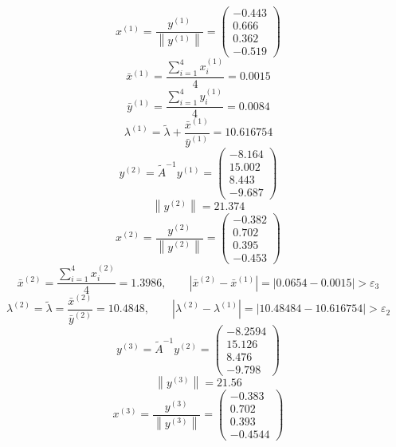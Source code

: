 \documentclass[a4paper,12pt,notitlepage,pdftex,headsepline]{scrartcl}
\begin{document}
\[
x^{\left(1\right)} = \frac{y^{\left(1\right)}}{\left\|y^{\left(1\right)}\right\|} = \left(\begin{matrix}
-0.443\\
0.666\\
0.362\\
-0.519
\end{matrix}
\right)
\]
\[
\bar{x}^{\left(1\right)} = \frac{\sum\limits_{i=1}^4{x_i^{\left(1\right)} }}{4} = 0.0015
\]
\[
\bar{y}^{\left(1\right)}  = \frac{\sum\limits_{i=1}^4{y_i^{\left(1\right)} }}{4} = 0.0084
\]
\[
\lambda^{\left(1\right)} = \tilde{\lambda} + \frac{\bar{x}^{\left(1\right)} }{\bar{y}^{\left(1\right)} } = 10.616754
\]
\[
y^{\left(2\right)} = \tilde{A}^{-1} y^{\left(1\right)}  = \left(\begin{matrix}
-8.164\\
15.002\\
8.443\\
-9.687
\end{matrix}
\right)
\]
\[\left\|y^{\left(2\right)} \right\| = 21.374\]
\[x^{\left(2\right)} = \frac{y^{\left(2\right)} }{\left\|y^{\left(2\right)} \right\|}=\left(\begin{matrix}
-0.382\\
0.702\\
0.395\\
-0.453
\end{matrix}\right)\]
\[\bar{x}^{\left(2\right)} = \frac{\sum\limits_{i=1}^4{x_i^{\left(2\right)} }}{4} = 1.3986,\qquad\left|\bar{x}^{\left(2\right)} - \bar{x}^{\left(1\right)} \right| = \left|0.0654 - 0.0015\right| > \varepsilon_3\]
\[\lambda^{\left(2\right)} = \tilde{\lambda} = \frac{\bar{x}^{\left(2\right)} }{\bar{y}^{\left(2\right)} } =10.4848, \qquad \left|\lambda^{\left(2\right)} - \lambda^{\left(1\right)} \right| = \left|10.48484 - 10.616754\right| > \varepsilon_2\]
\[y^{\left(3\right)}  = \tilde{A}^{-1} y^{\left(2\right)}  = \left(\begin{matrix}
-8.2594\\
15.126\\
8.476\\
-9.798
\end{matrix}\right)\]
\[\left\|y^{\left(3\right)} \right\| = 21.56\]
\[x^{\left(3\right)} = \frac{y^{\left(3\right)} }{\left\|y^{\left(3\right)} \right\|} = \left(\begin{matrix}
-0.383\\
0.702\\
0.393\\
-0.4544
\end{matrix}
\right)\]
\end{document}
